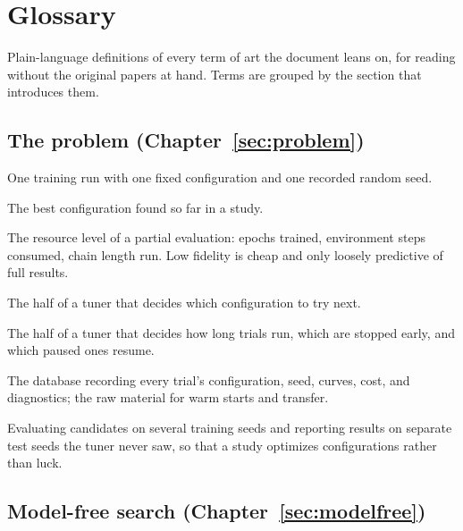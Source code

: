 \chapter*{Glossary}

Plain-language definitions of every term of art the document leans on,
for reading without the original papers at hand. Terms are grouped by
the section that introduces them.

\section*{The problem (Chapter~\ref{sec:problem})}

\begin{description}[leftmargin=1.5em, itemsep=1pt, font=\normalfont\bfseries]
\item[trial] One training run with one fixed configuration and one
recorded random seed.
\item[incumbent] The best configuration found so far in a study.
\item[fidelity] The resource level of a partial evaluation: epochs
trained, environment steps consumed, chain length run. Low fidelity is
cheap and only loosely predictive of full results.
\item[searcher] The half of a tuner that decides which configuration to
try next.
\item[scheduler] The half of a tuner that decides how long trials run,
which are stopped early, and which paused ones resume.
\item[run store] The database recording every trial's configuration,
seed, curves, cost, and diagnostics; the raw material for warm starts
and transfer.
\item[seed protocol] Evaluating candidates on several training seeds and
reporting results on separate test seeds the tuner never saw, so that a
study optimizes configurations rather than luck.
\end{description}

\section*{Model-free search (Chapter~\ref{sec:modelfree})}

